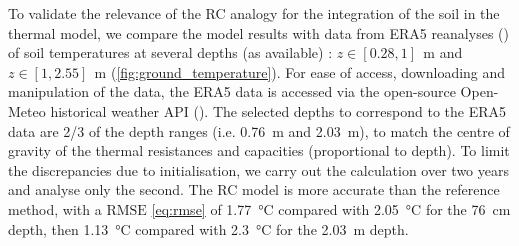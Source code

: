 \documentclass[11pt]{article}
\begin{document}
            To validate the relevance of the RC analogy for the integration of the soil in the thermal model, we compare the model results with data from ERA5 reanalyses (\cite{hersbach_era5_2020}) of soil temperatures at several depths (as available) : $z \in [0.28,1]~\SI{}{\meter}$ and $z\in [1,2.55]~\SI{}{\meter}$ (\ref{fig:ground_temperature}). For ease of access, downloading and manipulation of the data, the ERA5 data is accessed via the open-source Open-Meteo historical weather API (\cite{zippenfenig_open-meteocom_2024}). The selected depths to correspond to the ERA5 data are 2/3 of the depth ranges (i.e. \SI{0.76}{\meter} and \SI{2.03}{\meter}), to match the centre of gravity of the thermal resistances and capacities (proportional to depth). To limit the discrepancies due to initialisation, we carry out the calculation over two years and analyse only the second. The RC model is more accurate than the reference method, with a $\mathrm{RMSE}$ \eqref{eq:rmse} of \SI{1.77}{\celsius} compared with \SI{2.05}{\celsius} for the \SI{76}{\centi\meter} depth, then \SI{1.13}{\celsius} compared with \SI{2.3}{\celsius} for the \SI{2.03}{\meter} depth. 
\end{document}
